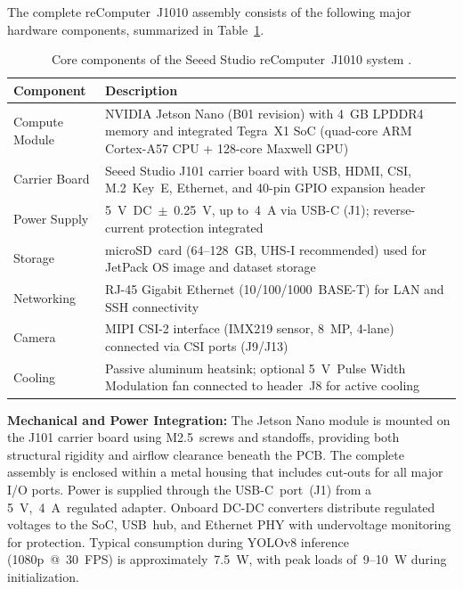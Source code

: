 \bigskip
The complete reComputer~J1010 assembly consists of the following major hardware components, summarized in Table~\ref{tab:core_components}.

\begin{table}[H]
	\centering
	\caption{Core components of the Seeed Studio reComputer~J1010 system \cite{seeedJ101Manual,jetsonNanoDatasheet,jetson_carrier_designguide}.}
	\label{tab:core_components}
	\begin{tabular}{|p{4cm}|p{9cm}|}
		\hline
		\textbf{Component} & \textbf{Description} \\ \hline
		Compute Module & NVIDIA Jetson Nano (B01 revision) with 4~GB LPDDR4 memory and integrated Tegra~X1 \ac{SoC} (quad-core ARM Cortex-A57 CPU + 128-core Maxwell \ac{GPU}) \\ \hline
		Carrier Board & Seeed Studio J101 carrier board with \ac{USB}, \ac{HDMI}, \ac{CSI}, M.2~Key~E, Ethernet, and 40-pin \ac{GPIO} expansion header \\ \hline
		Power Supply & 5~V~DC~$\pm$~0.25~V, up to~4~A via \ac{USB}-C (J1); reverse-current protection integrated \\ \hline
		Storage & microSD~card (64–128~GB, UHS-I recommended) used for JetPack OS image and dataset storage \\ \hline
		Networking & RJ-45 Gigabit Ethernet (10/100/1000~BASE-T) for \ac{LAN} and SSH connectivity \\ \hline
		Camera & MIPI \ac{CSI}-2 interface (IMX219 sensor, 8~MP, 4-lane) connected via \ac{CSI} ports (J9/J13) \\ \hline
		Cooling & Passive aluminum heatsink; optional 5~V~Pulse Width Modulation fan connected to header~J8 for active cooling \\ \hline
	\end{tabular}
\end{table}

\bigskip
\textbf{Mechanical and Power Integration:}  
The Jetson Nano module is mounted on the J101 carrier board using M2.5~screws and standoffs, providing both structural rigidity and airflow clearance beneath the PCB.  
The complete assembly is enclosed within a metal housing that includes cut-outs for all major I/O ports.  
Power is supplied through the \ac{USB}-C~port~(J1) from a 5~V,~4~A~regulated adapter.  
Onboard DC-DC converters distribute regulated voltages to the \ac{SoC}, \ac{USB}~hub, and Ethernet PHY with undervoltage monitoring for protection.  
Typical consumption during YOLOv8 inference (1080p~@~30~FPS) is approximately~7.5~W, with peak loads of~9–10~W during initialization.

